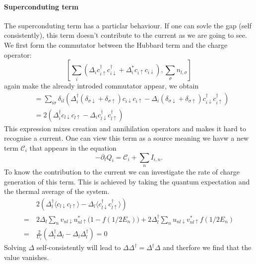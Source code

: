\documentclass[../main.tex]{subfile}
\begin{document}
\paragraph{Superconduting term} The superconduting term has a particlar behaviour. If one can sovle the gap (self consistently), this term 
doesn't contribute to the current as we are going to see. We first form the commutator between the Hubbard term and the charge operator:
\begin{equation*}
        \left[\sum_i\left(\Delta_i c_{i\uparrow}^{\dagger}c_{i\downarrow}^{\dagger} + 
        \Delta_i^{\ast} c_{i\uparrow}c_{i\downarrow}\right) , \sum_{\sigma} n_{l,\sigma}\right]
\end{equation*}
again make the already introded commutator appear, we obtain
\begin{equation*}
    \begin{aligned}
    &= \sum_{i\sigma} \delta_{il}\left(\Delta_i^{\dagger} (\delta_{\sigma\downarrow} + \delta_{\sigma\uparrow})c_{i\downarrow}c_{i\uparrow} 
    -\Delta_i(\delta_{\sigma\downarrow} + \delta_{\sigma\uparrow})c_{i\downarrow}^{\dagger} c_{i\uparrow}^{\dagger}\right)\\
    &= 2 \left( \Delta_i^{\dagger} c_{l\downarrow}c_{l\uparrow} - \Delta_i c_{l\downarrow}^{\dagger}c_{l\uparrow}^{\dagger}\right)
    \end{aligned}
\end{equation*}
This expression mixes creation and annihilation operators and makes it hard to recognise a current. One can view this term as a 
source meaning we havw a new term $\mathcal{C}_i$ that appears in the equation  
\[
    -\partial_t Q_i = \mathcal{C}_i +  \sum_n I_{i,n}  .
\]
To know the contribution to the current we can investigate the rate of charge generation of this term. This is achieved by taking the quantum
expectation and the thermal average of the system.
\begin{align*}
    &~2\left(\Delta_l^{\dagger}\langle c_{l\downarrow}c_{l\uparrow}\rangle - \Delta_l\langle c_{l\downarrow}^{\dagger}c_{l\uparrow}^{\dagger}\rangle\right)\\
    =&~ 2 \Delta_l \sum_{n} v_{nl\downarrow}u_{nl\uparrow}^{\ast} \bigl(1-f\left(1/2 E_n\right)\bigr) + 2 \Delta_l^{\dagger} \sum_{n} u_{nl\downarrow}v_{nl\uparrow}^{\ast} f\left(1/2 E_n\right)\\
    =& ~ \frac{2}{U_i}\left(\Delta_l^{\dagger}\Delta_l -\Delta_l \Delta_l^{\dagger} \right) = 0
\end{align*}
Solving $\Delta$ self-consistently will lead to $\Delta\Delta^{\dagger} = \Delta^{\dagger}\Delta$ and therfore we find that the value vanishes.
\end{document}
